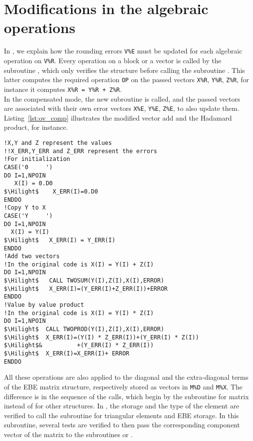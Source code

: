 \section{Modifications in the algebraic operations }
\label{sec:imple_op}
%
In \cite{LaND16}, we explain how the
rounding errors \texttt{V\%E} must be updated for each
algebraic operation on \texttt{V\%R}.
Every operation on a block or a vector is called by
the subroutine , which only verifies the structure
before calling the subroutine .
This latter computes the required operation \texttt{OP}
on the passed vectors \texttt{X\%R}, \texttt{Y\%R}, \texttt{Z\%R},
for instance it computes \texttt{X\%R = Y\%R + Z\%R}.\\
%
In the compensated mode, the new subroutine
 is called, and the passed vectors
are associated with their own error vectors
\texttt{X\%E}, \texttt{Y\%E}, \texttt{Z\%E}, to also update them.
Listing~\ref{lst:ov_comp} illustrates the modified vector add and
the Hadamard product, for instance.
%
\begin{lstlisting}[language=TelFortran,
caption={The algebraic operations in \telfile{OV\_COMP} },
label={lst:ov_comp},escapechar=\$]
!X,Y and Z represent the values
!!X_ERR,Y_ERR and Z_ERR represent the errors
!For initialization
CASE('0     ')
DO I=1,NPOIN
   X(I) = 0.D0
$\Hilight$    X_ERR(I)=0.D0
ENDDO
!Copy Y to X
CASE('Y     ')
DO I=1,NPOIN
  X(I) = Y(I)
$\Hilight$   X_ERR(I) = Y_ERR(I)
ENDDO
!Add two vectors
!In the original code is X(I) = Y(I) + Z(I)
DO I=1,NPOIN
$\Hilight$   CALL TWOSUM(Y(I),Z(I),X(I),ERROR)
$\Hilight$   X_ERR(I)=(Y_ERR(I)+Z_ERR(I))+ERROR
ENDDO
!Value by value product
!In the original code is X(I) = Y(I) * Z(I)
DO I=1,NPOIN
$\Hilight$  CALL TWOPROD(Y(I),Z(I),X(I),ERROR)
$\Hilight$  X_ERR(I)=(Y(I) * Z_ERR(I))+(Y_ERR(I) * Z(I))
$\Hilight$&          +(Y_ERR(I) * Z_ERR(I))
$\Hilight$  X_ERR(I)=X_ERR(I)+ ERROR
ENDDO
\end{lstlisting}
%
All these operations are also applied to the diagonal and
the extra-diagonal terms of the EBE matrix structure,
respectively stored as vectors in \texttt{M\%D} and \texttt{M\%X}.
The difference is in the sequence of the calls, which begin
by the subroutine  for matrix instead of 
for other structures.
In , the storage and the type of the
element are verified to call the subroutine 
for triangular elements and EBE storage.
In this subroutine, several tests are verified to then
pass the corresponding component vector of the matrix
to the subroutines  or .
